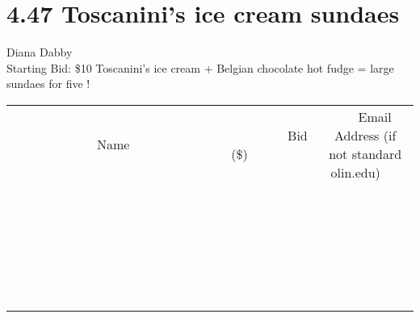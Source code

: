 \documentclass[11pt]{article}
\begin{document}
\section*{4.47 Toscanini's ice cream sundaes}
Diana Dabby
\\
Starting Bid: \$10
\newline
Toscanini's ice cream + Belgian chocolate hot fudge = large sundaes for five !
\\[6ex]
\begin{tabular}{c c c}
~~~~~~~~~~~~~Name~~~~~~~~~~~~~ & ~~~~~~~~~Bid (\$)~~~~~~~~~  & ~~~Email Address (if not standard olin.edu)~~~\\
 & & \\
\hline
 & & \\
\hline
 & & \\
\hline
 & & \\
\hline
 & & \\
\hline
 & & \\
\hline
 & & \\
\hline
 & & \\
\hline
 & & \\
\hline
 & & \\
\hline
 & & \\
\hline
 & & \\
\hline
 & & \\
\hline
 & & \\
\hline
 & & \\
\hline
 & & \\
\hline
 & & \\
\hline
 & & \\
\hline
 & & \\
\hline
 & & \\
\hline
 & & \\
\hline
 & & \\
\hline
 & & \\
\hline
 & & \\
\hline
 & & \\
\hline
 & & \\
\hline
\end{tabular}
\newpage
\end{document}
